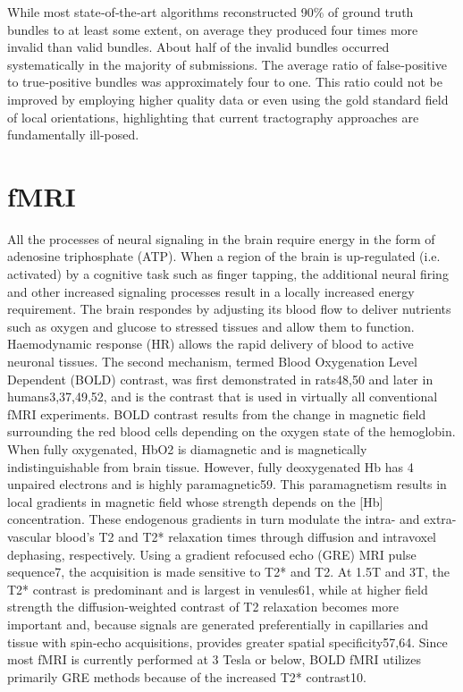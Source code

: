 While most state‐of‐the‐art algorithms  reconstructed 90\% of ground truth bundles to at least some extent, on average they produced four times more invalid than valid  bundles. About half of the invalid bundles occurred systematically in the majority of submissions. 
The average ratio of false‐positive to true‐positive bundles was approximately four to one.
This ratio could not be improved by employing higher quality data or even using the gold standard field of local orientations, highlighting that current tractography approaches are fundamentally ill‐posed.


\section{fMRI}
\cite{Glover2011}
All the processes of neural signaling in the brain require energy in the form of adenosine triphosphate (ATP).
When a region of the brain is up-regulated (i.e. activated) by a cognitive task such as finger tapping, the additional neural firing and other increased signaling processes result in a locally increased energy requirement.
The brain respondes by adjusting its blood flow to deliver nutrients such as oxygen and glucose to stressed tissues and allow them to function. Haemodynamic response (HR) allows the rapid delivery of blood to active neuronal tissues.
The second mechanism, termed Blood Oxygenation Level Dependent (BOLD) contrast, was first demonstrated in rats48,50 and later in humans3,37,49,52, and is the contrast that is used in virtually all conventional fMRI experiments. BOLD contrast results from the change in magnetic field surrounding the red blood cells depending on the oxygen state of the hemoglobin. When fully oxygenated, HbO2 is diamagnetic and is magnetically indistinguishable from brain tissue. However, fully deoxygenated Hb has 4 unpaired electrons and is highly paramagnetic59. This paramagnetism results in local gradients in magnetic field whose strength depends on the [Hb] concentration. These endogenous gradients in turn modulate the intra- and extra-vascular blood’s T2 and T2* relaxation times through diffusion and intravoxel dephasing, respectively. Using a gradient refocused echo (GRE) MRI pulse sequence7, the acquisition is made sensitive to T2* and T2. At 1.5T and
3T, the T2* contrast is predominant and is largest in venules61, while at higher field strength the diffusion-weighted contrast of T2 relaxation becomes more important and, because signals are generated preferentially in capillaries and tissue with spin-echo acquisitions, provides greater spatial specificity57,64. Since most fMRI is currently performed at 3 Tesla or below, BOLD fMRI utilizes primarily GRE methods because of the increased T2* contrast10.

